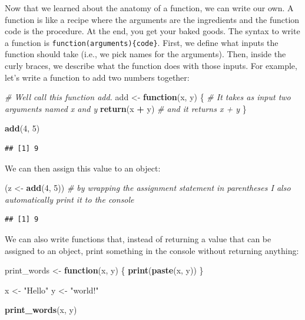 \documentclass[
]{book}
\newenvironment{Shaded}{\begin{snugshade}}{\end{snugshade}}
\newcommand{\CommentTok}[1]{\textcolor[rgb]{0.56,0.35,0.01}{\textit{#1}}}
\newcommand{\ControlFlowTok}[1]{\textcolor[rgb]{0.13,0.29,0.53}{\textbf{#1}}}
\newcommand{\DecValTok}[1]{\textcolor[rgb]{0.00,0.00,0.81}{#1}}
\newcommand{\FunctionTok}[1]{\textcolor[rgb]{0.13,0.29,0.53}{\textbf{#1}}}
\newcommand{\NormalTok}[1]{#1}
\newcommand{\OtherTok}[1]{\textcolor[rgb]{0.56,0.35,0.01}{#1}}
\newcommand{\SpecialCharTok}[1]{\textcolor[rgb]{0.81,0.36,0.00}{\textbf{#1}}}
\newcommand{\StringTok}[1]{\textcolor[rgb]{0.31,0.60,0.02}{#1}}
\begin{document}
Now that we learned about the anatomy of a function, we can write our own. A
function is like a recipe where the arguments are the ingredients and the
function code is the procedure. At the end, you get your baked goods. The
syntax to write a function is \texttt{function(arguments)\{code\}}. First, we define what
inputs the function should take (i.e., we pick names for the arguments). Then,
inside the curly braces, we describe what the function does with those inputs.
For example, let's write a function to add two numbers together:

\begin{Shaded}
\begin{Highlighting}[]
\CommentTok{\# We\textquotesingle{}ll call this function \textquotesingle{}add\textquotesingle{}. }
\NormalTok{add }\OtherTok{\textless{}{-}} \ControlFlowTok{function}\NormalTok{(x, y) \{ }\CommentTok{\# It takes as input two arguments named \textasciigrave{}x\textasciigrave{} and \textasciigrave{}y\textasciigrave{}}
  \FunctionTok{return}\NormalTok{(x }\SpecialCharTok{+}\NormalTok{ y) }\CommentTok{\# and it returns x + y}
\NormalTok{\}}

\FunctionTok{add}\NormalTok{(}\DecValTok{4}\NormalTok{, }\DecValTok{5}\NormalTok{)}
\end{Highlighting}
\end{Shaded}

\begin{verbatim}
## [1] 9
\end{verbatim}

We can then assign this value to an object:

\begin{Shaded}
\begin{Highlighting}[]
\NormalTok{(z }\OtherTok{\textless{}{-}} \FunctionTok{add}\NormalTok{(}\DecValTok{4}\NormalTok{, }\DecValTok{5}\NormalTok{)) }\CommentTok{\# by wrapping the assignment statement in parentheses I also automatically print it to the console}
\end{Highlighting}
\end{Shaded}

\begin{verbatim}
## [1] 9
\end{verbatim}

We can also write functions that, instead of returning a value that can be
assigned to an object, print something in the console without returning anything:

\begin{Shaded}
\begin{Highlighting}[]
\NormalTok{print\_words }\OtherTok{\textless{}{-}} \ControlFlowTok{function}\NormalTok{(x, y) \{}
  \FunctionTok{print}\NormalTok{(}\FunctionTok{paste}\NormalTok{(x, y))}
\NormalTok{\}}

\NormalTok{x }\OtherTok{\textless{}{-}} \StringTok{"Hello"}
\NormalTok{y }\OtherTok{\textless{}{-}} \StringTok{"world!"}

\FunctionTok{print\_words}\NormalTok{(x, y)}
\end{Highlighting}
\end{Shaded}
\end{document}
